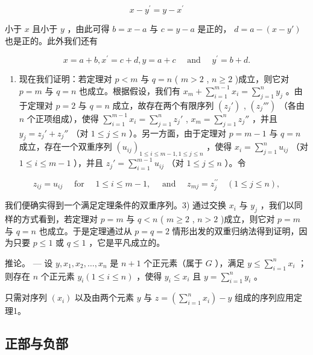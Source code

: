 \[
x - y ^ {\prime} = y - x ^ {\prime}
\]

小于 \(x\) 且小于 \(y\) ，由此可得 \(b = x - a\) 与 \(c = y - a\) 是正的， \(d = a - (x - y')\) 也是正的。此外我们还有

\[
x = a + b, x ^ {\prime} = c + d, y = a + c \quad \text { and } \quad y ^ {\prime} = b + d.
\]

\begin{enumerate}
\def\labelenumi{\arabic{enumi})}
\setcounter{enumi}{1}
\tightlist
\item
  现在我们证明：若定理对 \(p < m\) 与 \(q = n\) ( \(m > 2\) , \(n \geqslant 2\) )成立，则它对 \(p = m\) 与 \(q = n\) 也成立。根据假设，我们有 \(x_{m} + \sum_{i=1}^{m-1} x_{i} = \sum_{j=1}^{n} y_{j}\) 。由于定理对 \(p = 2\) 与 \(q = n\) 成立，故存在两个有限序列 \((z_{j}')\) , \((z_{j}''')\) （各由 \(n\) 个正项组成），使得 \(\sum_{i=1}^{m-1} x_{i} = \sum_{j=1}^{n} z_{j}'\) , \(x_{m} = \sum_{j=1}^{n} z_{j}''\) ，并且 \(y_{j} = z_{j}' + z_{j}''\) （对 \(1 \leqslant j \leqslant n\) ）。另一方面，由于定理对 \(p = m-1\) 与 \(q = n\) 成立，存在一个双重序列 \((u_{ij})_{1 \leqslant i \leqslant m-1, 1 \leqslant j \leqslant n}\) ，使得 \(x_{i} = \sum_{j=1}^{n} u_{ij}\) （对 \(1 \leqslant i \leqslant m-1\) ），并且 \(z_{j}' = \sum_{i=1}^{m-1} u_{ij}\) （对 \(1 \leqslant j \leqslant n\) ）。令
\end{enumerate}

\[
z _ {i j} = u _ {i j} \quad \text { for } \quad 1 \leqslant i \leqslant m - 1, \quad \text { and } \quad z _ {m j} = z _ {j} ^ {\prime \prime} \quad (1 \leqslant j \leqslant n),
\]

我们便确实得到一个满足定理条件的双重序列。3) 通过交换 \(x_{i}\) 与 \(y_{j}\) ，我们以同样的方式看到，若定理对 \(p = m\) 与 \(q < n\) ( \(m \geqslant 2\) , \(n > 2\) )成立，则它对 \(p = m\) 与 \(q = n\) 也成立。于是定理通过从 \(p = q = 2\) 情形出发的双重归纳法得到证明，因为只要 \(p \leqslant 1\) 或 \(q \leqslant 1\) ，它是平凡成立的。

推论。 --- 设 \(y, x_1, x_2, \ldots, x_n\) 是 \(n + 1\) 个正元素（属于 \(G\) ），满足 \(y \leqslant \sum_{i=1}^{n} x_i\) ；则存在 \(n\) 个正元素 \(y_i (1 \leqslant i \leqslant n)\) ，使得 \(y_i \leqslant x_i\) 且 \(y = \sum_{i=1}^{n} y_i\) 。

只需对序列 \((x_{i})\) 以及由两个元素 \(y\) 与 \(z = \left(\sum_{i=1}^{n} x_{i}\right) - y\) 组成的序列应用定理1。

\subsection{正部与负部}

